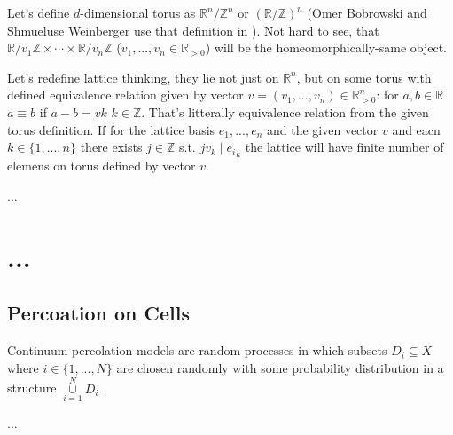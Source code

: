 \documentclass[a4paper, 12pt]{article}
\begin{document}
\par Let's define $d$-dimensional torus as $\mathbb{R}^n/\mathbb{Z}^n$ or $\left(\mathbb{R}/\mathbb{Z}\right)^n$ (Omer Bobrowski and Shmueluse Weinberger use that definition in \cite{vanish}). Not hard to see, that $\mathbb{R}/v_1\mathbb{Z}\times\cdots\times\mathbb{R}/v_n\mathbb{Z}$ ($v_1,..., v_n\in\mathbb{R}_{>0}$) will be the homeomorphically-same object.
\par Let's redefine lattice thinking, they lie not just on $\mathbb{R}^n$, but on some torus with defined equivalence relation given by vector $v = (v_1, ..., v_n)\in \mathbb{R}^n_{>0}$: for $a, b\in \mathbb{R}$ $a \equiv b$ if $a-b = vk$ $k\in\mathbb{Z}$. That's litterally equivalence relation from the given torus definition. If for the lattice basis $e_1, ..., e_n$ and the given vector $v$ and eacn $k\in\{1, ..., n\}$ there exists $j\in\mathbb{Z}$ s.t. $jv_k \mid {e_i}_k$ the lattice will have finite number of elemens on torus defined by vector $v$.
\par ...%

\section{...}
\subsection{Percoation on Cells}
\par Continuum-percolation models are random processes in which subsets $D_i \subseteq X$ where $i\in\{1, ..., N\}$ are chosen randomly with some probability distribution in a structure $\underset{i=1}{\overset{N}{\cup}} D_i$ \cite{percolationdisks}.
\par ...
\end{document}
